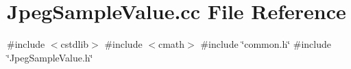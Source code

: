 \section{Jpeg\+Sample\+Value.\+cc File Reference}
\label{JpegSampleValue_8cc}
{\ttfamily \#include $<$cstdlib$>$}\newline
{\ttfamily \#include $<$cmath$>$}\newline
{\ttfamily \#include \char`\"{}common.\+h\char`\"{}}\newline
{\ttfamily \#include \char`\"{}Jpeg\+Sample\+Value.\+h\char`\"{}}\newline
